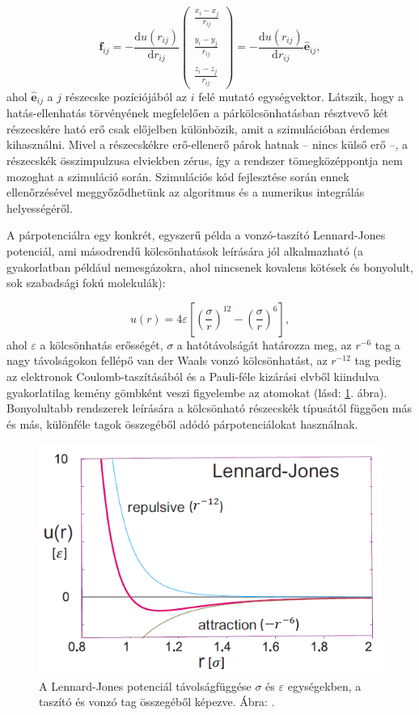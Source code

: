 \documentclass[12pt]{article}
\theoremstyle{plain}
\newcommand{\dd}{\textrm{d}}
\begin{document}
\begin{equation}
	\mathbf{f}_{ij} = -\frac{\dd u(r_{ij})}{\dd r_{ij}} \left( \begin{array}{c}
	\frac{x_i - x_j}{r_{ij}} \\ \\
	\frac{y_i - y_j}{r_{ij}} \\ \\
	\frac{z_i - z_j}{r_{ij}}
	\end{array}
	\right) = -\frac{\dd u(r_{ij})}{\dd r_{ij}} \hat{\mathbf{e}}_{ij},
\end{equation}
ahol $\hat{\mathbf{e}}_{ij}$ a $j$ részecske pozíciójából az $i$ felé mutató egységvektor. Látszik, hogy a hatás-ellenhatás törvényének megfelelően a párkölcsönhatásban résztvevő két részecskére ható erő csak előjelben különbözik, amit a szimulációban érdemes kihasználni. Mivel a részecskékre erő-ellenerő párok hatnak -- nincs külső erő --, a részecskék összimpulzusa elviekben zérus, így a rendszer tömegközéppontja nem mozoghat a szimuláció során. Szimulációs kód fejlesztése során ennek ellenőrzésével meggyőződhetünk az algoritmus és a numerikus integrálás helyességéről.

A párpotenciálra egy konkrét, egyszerű példa a vonzó-taszító Lennard-Jones potenciál, ami másodrendű kölcsönhatások leírására jól alkalmazható (a gyakorlatban például nemesgázokra, ahol nincsenek kovalens kötések és bonyolult, sok szabadsági fokú molekulák):

\begin{equation}
u(r) = 4\varepsilon \left[ \left(\frac{\sigma}{r}\right)^{12} - \left(\frac{\sigma}{r}\right)^{6} \right],
\end{equation}
ahol $\varepsilon$ a kölcsönhatás erősségét, $\sigma$ a hatótávolságát határozza meg, az $r^{-6}$ tag a nagy távolságokon fellépő van der Waals vonzó kölcsönhatást, az $r^{-12}$ tag pedig az elektronok Coulomb-taszításából és a Pauli-féle kizárási elvből kiindulva gyakorlatilag kemény gömbként veszi figyelembe az atomokat (lásd: \ref{fig:lj}. ábra). Bonyolultabb rendszerek leírására a kölcsönható részecskék típusától függően más és más, különféle tagok összegéből adódó párpotenciálokat használnak.


\begin{figure}
	\centering
	\includegraphics[width=0.6\linewidth]{media/LJ}
	\caption{A Lennard-Jones potenciál távolságfüggése $\sigma$ és $\varepsilon$ egységekben, a taszító és vonzó tag összegéből képezve. Ábra: \cite{Landau2012}.}
	\label{fig:lj}
\end{figure}
\end{document}
